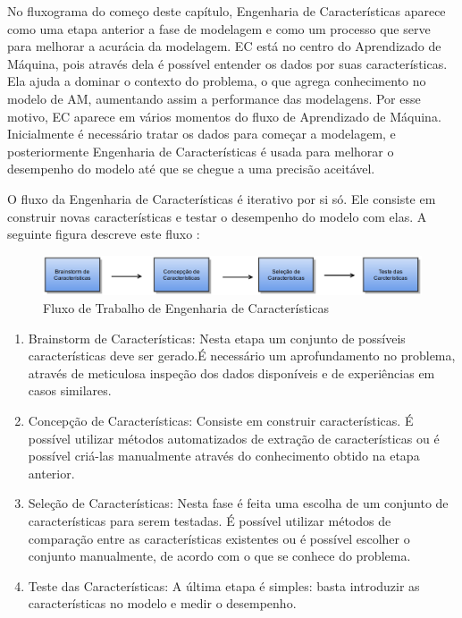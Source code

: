No fluxograma do começo deste capítulo, Engenharia de Características aparece como uma etapa anterior a fase de modelagem e como um processo que serve para melhorar a acurácia da modelagem. EC está no centro do Aprendizado de Máquina, pois através dela é possível entender os dados por suas características. Ela ajuda a dominar o contexto do problema, o que agrega conhecimento no modelo de AM, aumentando assim a performance das modelagens. Por esse motivo, EC aparece em vários momentos do fluxo de Aprendizado de Máquina. Inicialmente é necessário tratar os dados para começar a modelagem, e posteriormente Engenharia de Características é usada para melhorar o desempenho do modelo até que se chegue a uma precisão aceitável. 

O fluxo da Engenharia de Características é iterativo por si só. Ele consiste em construir novas características e testar o desempenho do modelo com elas. A seguinte figura descreve este fluxo \cite{fe2014}:


\begin{figure}[!h]
\centering
\includegraphics[keepaspectratio=true,scale=0.32]
{figuras/ecworflow.eps}
\caption{Fluxo de Trabalho de Engenharia de Características}
\label{workflow_ec}
\end{figure}

\begin{enumerate}
\item Brainstorm de Características: Nesta etapa um conjunto de possíveis características deve ser gerado.É necessário um aprofundamento no problema, através de meticulosa inspeção dos dados disponíveis e de experiências em casos similares. 
\item Concepção de Características: Consiste em construir características. É possível utilizar métodos automatizados de extração de características ou é possível criá-las manualmente através do conhecimento obtido na etapa anterior.
\item Seleção de Características: Nesta fase é feita uma escolha de um conjunto de características para serem testadas. É possível utilizar métodos de comparação entre as características existentes ou é possível escolher o conjunto  manualmente, de acordo com o que se conhece do problema.
\item Teste das Características: A última etapa é simples: basta introduzir as características no modelo e medir o desempenho.
\end{enumerate}

